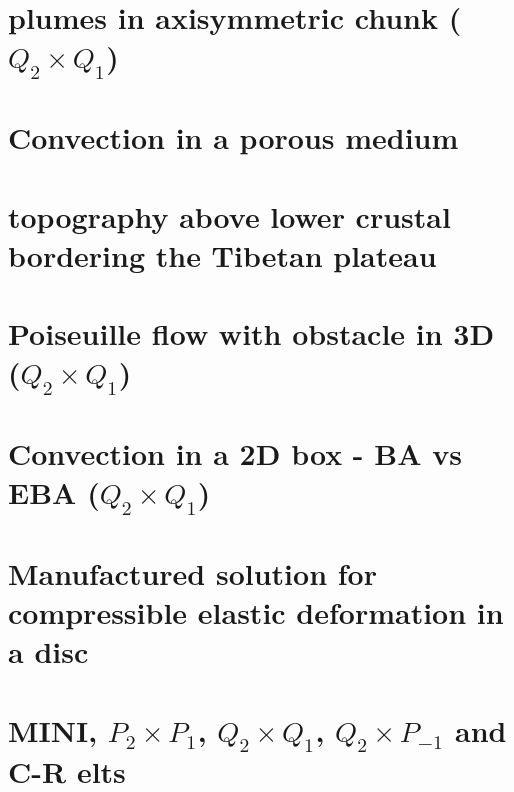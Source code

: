 \documentclass[a4paper,11pt]{report}
\begin{document}
\chapter{plumes in axisymmetric chunk ($Q_2\times Q_1$)  \label{f106}} %

\chapter{Convection in a porous medium  \label{f107}} %

\chapter{topography above lower crustal bordering the Tibetan plateau \label{f108}} %

\chapter{Poiseuille flow with obstacle in 3D ($Q_2\times Q_1$) \label{f109}} %

\chapter{Convection in a 2D box - BA vs EBA ($Q_2\times Q_1$) \label{f110}} %

\chapter{Manufactured solution for compressible elastic deformation in a disc\label{f111}} %

\chapter{MINI, $P_2\times P_1$,  $Q_2\times Q_1$, $Q_2\times P_{-1}$ and C-R elts\label{f112}} %
\end{document}

